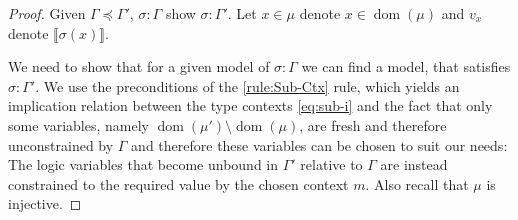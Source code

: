 \documentclass[twoside, english, final]{sdqthesis}
\newcommand{\bbracket}[1]{\llbracket #1 \rrbracket}
\DeclareMathOperator{\dom}{dom}
\theoremstyle{definition}
\begin{document}
\begin{proof}
  Given $\Gamma \preceq \Gamma'$, $\sigma : \Gamma$ show $\sigma : \Gamma'$. Let $x \in \mu$ denote $x \in \dom(\mu)$ and $v_x$ denote $\bbracket{\sigma(x)}$.

  We need to show that for a given model of $\sigma : \Gamma$ we can find a model, that satisfies $\sigma : \Gamma'$. We use the preconditions of the \cref{rule:Sub-Ctx} rule, which yields an implication relation between the type contexts \eqref{eq:sub-i} and the fact that only some variables, namely $\dom(\mu') \setminus \dom(\mu)$, are fresh and therefore unconstrained by $\Gamma$ and therefore these variables can be chosen to suit our needs: The logic variables that become unbound in $\Gamma'$ relative to $\Gamma$ are instead constrained to the required value by the chosen context $m$. 
  Also recall that $\mu$ is injective.


\end{proof}
\end{document}
